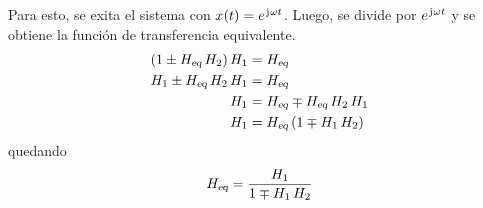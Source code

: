 Para esto, se exita el sistema con $\fx[x]{t} = \complexExp$.
Luego, se divide por $\complexExp$ y se obtiene la función de transferencia equivalente.
\begin{align*}
    \inParentheses{1 \pm \sub{H}{eq} \, H_2} H_1
    & = \sub{H}{eq}
    \\
    H_1 \pm \sub{H}{eq} \, H_2 \, H_1
    & = \sub{H}{eq}
    \\
    H_1
    & = \sub{H}{eq} \mp \sub{H}{eq} \, H_2 \, H_1
    \\
    H_1
    & = \sub{H}{eq} \inParentheses{1 \mp H_1 \, H_2}
\end{align*}
quedando
\[
    \sub{H}{eq} = \frac{H_1}{1 \mp H_1 \, H_2}
\]